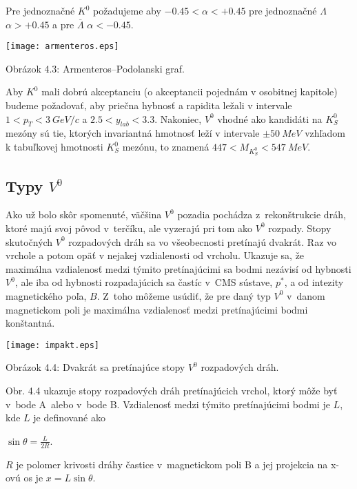Pre jednoznačné $K^{0}$ požadujeme aby $ -0.45< \alpha <+0.45$ pre
jednoznačné $\Lambda$ $\alpha >+0.45$ a pre $\overline{\Lambda}$ $\alpha
<-0.45$. 

\begin{center}
  \texttt{[image: armenteros.eps]}
\end{center}
\begin{center}
  Obrázok 4.3: Armenteros--Podolanski graf.
\end{center}

Aby $K^{0}$ mali dobrú akceptanciu (o akceptancii pojednám v osobitnej
kapitole) budeme požadovať, aby priečna hybnosť a rapidita ležali v intervale
$1<p_{T}<3\: GeV/c$ a $2.5<y_{lab}<3.3$.   Nakoniec, $V^{0}$ vhodné ako
kandidáti na $K^{0}_{S}$ mezóny sú tie, ktorých invariantná hmotnosť leží v
intervale $\pm 50\: MeV$ vzhľadom k tabuľkovej  hmotnosti $K^{0}_{S}$ mezónu,
to znamená $447 < M_{K^{0}_{S}} < 547\: MeV$.
 
\subsection{Typy $V^{0}$}
Ako už bolo skôr spomenuté, väčšina $V^{0}$ pozadia pochádza 
z~rekonštrukcie dráh, ktoré majú svoj pôvod v~terčíku, ale vyzerajú pri tom
ako $V^{0}$ rozpady. Stopy skutočných $V^{0}$ rozpadových dráh sa
vo všeobecnosti pretínajú dvakrát. Raz vo vrchole a potom opäť v nejakej
vzdialenosti od vrcholu. Ukazuje sa, že maximálna vzdialenosť medzi týmito
pretínajúcimi sa bodmi nezávisí od hybnosti $V^{0}$, ale iba od hybnosti
rozpadajúcich sa častíc v~CMS sústave, $p^{*}$, a od intezity magnetického
poľa, $B$. Z~toho môžeme usúdiť, že pre daný typ $V^{0}$ v~danom magnetickom
poli je maximálna vzdialenosť medzi pretínajúcimi bodmi konštantná.
\begin{center}
  \texttt{[image: impakt.eps]}
\end{center}
\begin{center}
  Obrázok 4.4: Dvakrát sa pretínajúce stopy  $V^{0}$ rozpadových dráh.
\end{center}

Obr. 4.4 ukazuje stopy rozpadových dráh pretínajúcich vrchol, ktorý môže byť
v~bode A~alebo v~bode B. Vzdialenosť medzi týmito pretínajúcimi bodmi je
$L$, kde $L$ je definované ako
\begin{center}
  $\sin\theta=\frac{L}{2R}$.
\end{center}
$R$ je polomer krivosti dráhy častice v~magnetickom poli B a jej projekcia na
x-ovú os je $x=L\sin\theta$.

